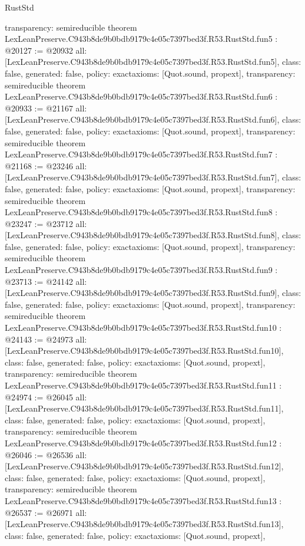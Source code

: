 \begin{lexlean}{RustStd}
\begin{coremodule}
{  transparency: semireducible
}
theorem LexLeanPreserve.C943b8de9b0bdb9179c4e05c7397bed3f.R53.RustStd.fun5 : @20127 := @20932 {
  all: [LexLeanPreserve.C943b8de9b0bdb9179c4e05c7397bed3f.R53.RustStd.fun5],
  class: false,
  generated: false,
  policy: exact{axioms: [Quot.sound, propext]},
  transparency: semireducible
}
theorem LexLeanPreserve.C943b8de9b0bdb9179c4e05c7397bed3f.R53.RustStd.fun6 : @20933 := @21167 {
  all: [LexLeanPreserve.C943b8de9b0bdb9179c4e05c7397bed3f.R53.RustStd.fun6],
  class: false,
  generated: false,
  policy: exact{axioms: [Quot.sound, propext]},
  transparency: semireducible
}
theorem LexLeanPreserve.C943b8de9b0bdb9179c4e05c7397bed3f.R53.RustStd.fun7 : @21168 := @23246 {
  all: [LexLeanPreserve.C943b8de9b0bdb9179c4e05c7397bed3f.R53.RustStd.fun7],
  class: false,
  generated: false,
  policy: exact{axioms: [Quot.sound, propext]},
  transparency: semireducible
}
theorem LexLeanPreserve.C943b8de9b0bdb9179c4e05c7397bed3f.R53.RustStd.fun8 : @23247 := @23712 {
  all: [LexLeanPreserve.C943b8de9b0bdb9179c4e05c7397bed3f.R53.RustStd.fun8],
  class: false,
  generated: false,
  policy: exact{axioms: [Quot.sound, propext]},
  transparency: semireducible
}
theorem LexLeanPreserve.C943b8de9b0bdb9179c4e05c7397bed3f.R53.RustStd.fun9 : @23713 := @24142 {
  all: [LexLeanPreserve.C943b8de9b0bdb9179c4e05c7397bed3f.R53.RustStd.fun9],
  class: false,
  generated: false,
  policy: exact{axioms: [Quot.sound, propext]},
  transparency: semireducible
}
theorem LexLeanPreserve.C943b8de9b0bdb9179c4e05c7397bed3f.R53.RustStd.fun10 : @24143 := @24973 {
  all: [LexLeanPreserve.C943b8de9b0bdb9179c4e05c7397bed3f.R53.RustStd.fun10],
  class: false,
  generated: false,
  policy: exact{axioms: [Quot.sound, propext]},
  transparency: semireducible
}
theorem LexLeanPreserve.C943b8de9b0bdb9179c4e05c7397bed3f.R53.RustStd.fun11 : @24974 := @26045 {
  all: [LexLeanPreserve.C943b8de9b0bdb9179c4e05c7397bed3f.R53.RustStd.fun11],
  class: false,
  generated: false,
  policy: exact{axioms: [Quot.sound, propext]},
  transparency: semireducible
}
theorem LexLeanPreserve.C943b8de9b0bdb9179c4e05c7397bed3f.R53.RustStd.fun12 : @26046 := @26536 {
  all: [LexLeanPreserve.C943b8de9b0bdb9179c4e05c7397bed3f.R53.RustStd.fun12],
  class: false,
  generated: false,
  policy: exact{axioms: [Quot.sound, propext]},
  transparency: semireducible
}
theorem LexLeanPreserve.C943b8de9b0bdb9179c4e05c7397bed3f.R53.RustStd.fun13 : @26537 := @26971 {
  all: [LexLeanPreserve.C943b8de9b0bdb9179c4e05c7397bed3f.R53.RustStd.fun13],
  class: false,
  generated: false,
  policy: exact{axioms: [Quot.sound, propext]},
}
\end{coremodule}
\end{lexlean}
